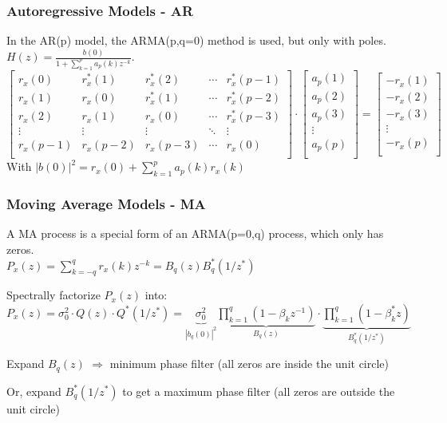\subsubsection{Autoregressive Models - AR }
\label{sec:autoregressive_model_method}
In the AR(p) model, the ARMA(p,q=0) method is used, but only with poles. $H(z)=\frac{b(0)}{1+\sum\limits_{k=1}^{p} a_p(k)z^{-k}}$.\\
 $$\begin{bmatrix}
	 	r_x(0)  & r_x^*(1) & r_x^*(2) & \cdots & r_x^*(p-1)\\
	 	r_x(1)  & r_x(0) & r_x^*(1) & \cdots & r_x^*(p-2)\\
	 	r_x(2)  & r_x(1) & r_x(0) & \cdots & r_x^*(p-3)\\
	 	\vdots  & \vdots  & \vdots  & \ddots & \vdots\\
	 	r_x(p-1)& r_x(p-2)& r_x(p-3)& \cdots &  r_x(0)\\
   \end{bmatrix} \cdot
   \begin{bmatrix}
    	a_p(1)\\
    	a_p(2)\\
    	a_p(3)\\
    	\vdots\\
    	a_p(p)\\
   \end{bmatrix}=
   \begin{bmatrix}
       	-r_x(1)\\
       	-r_x(2)\\
       	-r_x(3)\\
       	\vdots\\
        -r_x(p)\\
   \end{bmatrix}
 $$
 With $|b(0)|^2=r_x(0) + \sum\limits_{k=1}^{p} a_p(k)r_x(k)$



 \subsubsection{Moving Average Models - MA }
A MA process is a special form of an ARMA(p=0,q) process, which only has zeros.\\
$P_x(z)=\sum\limits_{k=-q}^{q}r_x(k)z^{-k}=B_q(z)B_q^*(1/z^*)$
\begin{aufzaehlung}
	\item Spectrally factorize $P_x(z)$ into: $P_x(z)=\sigma^2_0 \cdot Q(z)\cdot Q^*(1/z^*)=\underbrace{\sigma^2_0}_{|b_q(0)|^2} \underbrace{\prod\limits_{k=1}^q (1-\beta_k z^{-1})}_{B_q(z)} \cdot \underbrace{\prod\limits_{k=1}^q (1-\beta_k^* z)}_{B^*_q(1/z^*)}$
	\item Expand $B_q(z)$ $\Rightarrow$ minimum phase filter (all zeros are inside the unit circle)
	\item Or, expand $B_q^*(1/z^*)$ to get a maximum phase filter (all zeros are outside the unit circle)
\end{aufzaehlung}
